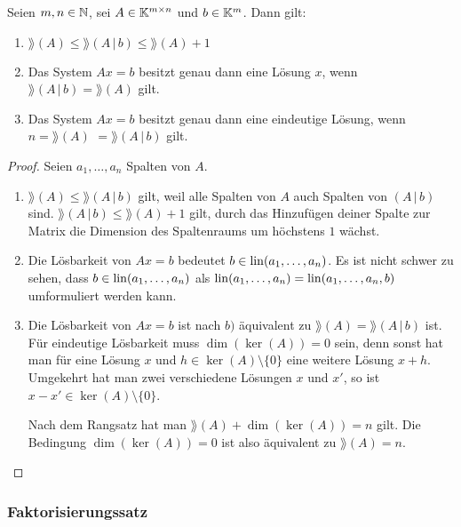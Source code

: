 \begin{thm}
	Seien $ m,n \in \mathbb N $, sei $ A \in \mathbb K^{m \times n} $ und $ b \in \mathbb K^m $. Dann gilt:
	\begin{enumerate}[label=\normalfont(\alph*)]
		\item $ \rang(A) \leq \rang(A \,|\, b) \leq \rang(A)+1 $
		\item Das System $ Ax = b $ besitzt genau dann eine Lösung $x$, wenn $ \rang(A \, |\, b) = \rang(A) $ gilt.
		\item Das System $ Ax = b $ besitzt genau dann eine eindeutige Lösung, wenn $ n = \rang(A) $ $ = \rang(A \,|\, b) $ gilt.
	\end{enumerate}
\end{thm}
\begin{proof} Seien $a_1,\ldots,a_n$ Spalten von $A$. 
	\begin{enumerate}[label=\normalfont(\alph*)]
			\item $\rang(A) \le \rang(A \, | \, b)$ gilt, weil alle Spalten von $A$ auch Spalten von $(A \, | \, b)$ sind. $\rang(A \, | \, b) \le \rang(A) + 1$ gilt, durch das Hinzufügen deiner Spalte zur Matrix die Dimension des Spaltenraums um höchstens $1$ wächst. 
			\item Die Lösbarkeit von $ Ax = b $ bedeutet $b \in \operatorname{lin}(a_1,\ldots,a_n)$. 
			Es ist nicht schwer zu sehen, dass $b \in \operatorname{lin}(a_1,\ldots,a_n)$ als $\operatorname{lin}(a_1,\ldots,a_n) = \operatorname{lin}(a_1,\ldots,a_n,b)$ umformuliert werden kann. 
			
			\item Die Lösbarkeit von $ Ax=b $ ist nach $ b) $ äquivalent zu $ \rang(A) = \rang(A \,|\, b) $ ist. Für eindeutige Lösbarkeit muss $ \dim(\ker(A)) = 0 $ sein, denn sonst hat man für eine Lösung $x$ und $h \in \ker(A) \setminus \{0\}$ eine weitere Lösung $x+h$. Umgekehrt hat man zwei verschiedene Lösungen $x$ und $x'$, so ist $x-x' \in \ker(A) \setminus \{0\}$. 
			
		Nach dem Rangsatz hat man $ \rang(A) + \dim(\ker(A)) = n $ gilt. Die Bedingung $\dim(\ker(A)) = 0$ ist also äquivalent zu $ \rang(A) = n $.
	\end{enumerate}
\end{proof}

\subsubsection{Faktorisierungssatz}

